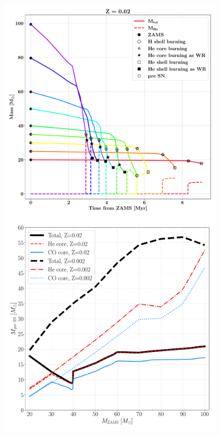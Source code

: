 \documentclass[a4paper,titlepage]{book}     	%
\begin{document}
\begin{figure}[h!]
	\begin{minipage}{.49\textwidth}
		\centering
		\includegraphics[width=1.05\textwidth]{./images/mass_Z02.pdf}
	\end{minipage}
	\hfill
	\begin{minipage}{.49\textwidth}
		\vspace{2mm}
		\centering
		\includegraphics[width=1.05\textwidth]{./images/preSN.pdf}	

\end{minipage}
\end{figure}
\end{document}

